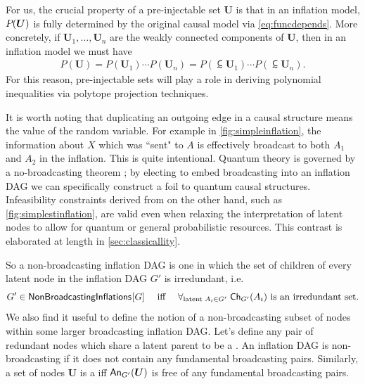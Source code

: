 For us, the crucial property of a pre-injectable set $\bm{U}$ is that in an inflation model, $\pdf{\bm{U}}$ is fully determined by the original causal model via \cref{eq:funcdepends}. More concretely, if $\bm{U}_1,\ldots,\bm{U}_n$ are the weakly connected components of $\bm{U}$, then in an inflation model we must have
\begin{align}\label{eq:preinjfactor}
	P(\bm{U}) = P(\bm{U}_1) \cdots P(\bm{U}_n) = P(\subsim{\bm{U}}_1) \cdots P(\subsim{\bm{U}}_n).
\end{align}
For this reason, pre-injectable sets will play a role in deriving polynomial inequalities via polytope projection techniques.

It is worth noting that duplicating an outgoing edge in a causal structure means  the value of the random variable. For example in \cref{fig:simpleinflation}, the information about $X$ which was ``sent" to $A$ is effectively broadcast to both $A_1$ and $A_2$ in the inflation. This is quite intentional. Quantum theory is governed by a no-broadcasting theorem \cite{NoCloningQuantum1996,NoCloningGeneral2006}; by electing to embed broadcasting into an inflation DAG we can specifically construct a foil to quantum causal structures. Infeasibility constraints derived from  on the other hand, such as \cref{fig:simplestinflation}, are valid even when relaxing the interpretation of latent nodes to allow for quantum or general probabilistic resources. This contrast is elaborated at length in \cref{sec:classicallity}.  

So a non-broadcasting inflation DAG is one in which the set of children of every latent node in the inflation DAG $G'$ is irredundant, i.e.  
\begin{align}\label{eq:nonbroadcastinginflationDAG}
G'\in\SmallNamedFunction{NonBroadcastingInflations}{G} \quad\text{ iff }\quad \forall_{\text{latent }A_i\in G'}\; \Ch[G']{A_i} \text{ is an irredundant set.}
\end{align}
We also find it useful to define the notion of a non-broadcasting subset of nodes within some larger broadcasting inflation DAG.
Let's define any pair of redundant nodes which share a latent parent to be a . An inflation DAG is non-broadcasting if it does not contain any fundamental broadcasting pairs. Similarly, a set of nodes $\bm{U}$ is a  iff $\An[G']{\bm{U}}$ is free of any fundamental broadcasting pairs.


